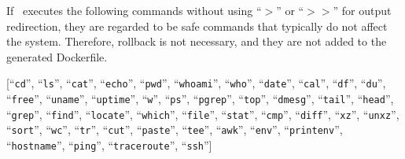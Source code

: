 If \tool~executes the following commands without using ``$>$'' or ``$>>$'' for output redirection, they are regarded to be safe commands that typically do not affect the system. Therefore, rollback is not necessary, and they are not added to the generated Dockerfile.

[``\texttt{cd}'', ``\texttt{ls}'', ``\texttt{cat}'', ``\texttt{echo}'', ``\texttt{pwd}'', ``\texttt{whoami}'', ``\texttt{who}'', ``\texttt{date}'', ``\texttt{cal}'', ``\texttt{df}'', ``\texttt{du}'', ``\texttt{free}'', ``\texttt{uname}'', ``\texttt{uptime}'', ``\texttt{w}'', ``\texttt{ps}'', ``\texttt{pgrep}'', ``\texttt{top}'', ``\texttt{dmesg}'', ``\texttt{tail}'', ``\texttt{head}'', ``\texttt{grep}'', ``\texttt{find}'', ``\texttt{locate}'', ``\texttt{which}'',
``\texttt{file}'', ``\texttt{stat}'', ``\texttt{cmp}'', ``\texttt{diff}'', 
``\texttt{xz}'', ``\texttt{unxz}'', ``\texttt{sort}'', ``\texttt{wc}'', ``\texttt{tr}'', ``\texttt{cut}'', ``\texttt{paste}'', ``\texttt{tee}'', ``\texttt{awk}'', ``\texttt{env}'', ``\texttt{printenv}'',
``\texttt{hostname}'', ``\texttt{ping}'', ``\texttt{traceroute}'', ``\texttt{ssh}'']
